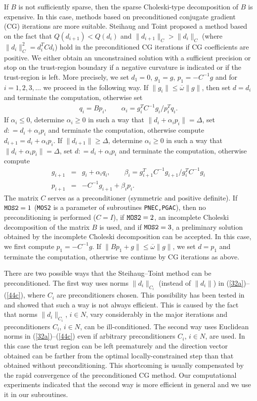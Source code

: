 \documentclass{esub2acm}
\newcommand{\beq}{\begin{eqnarray*}}
\newcommand{\eeq}{\end{eqnarray*}}
\begin{document}
\noindent If $B$ is not sufficiently sparse, then the sparse
Choleski-type decomposition of $B$ is expensive. In this case, methods
based on preconditioned conjugate gradient (CG) iterations are more
suitable. Steihaug \cite{ste1} and Toint \cite{toi1} proposed a
method based on the fact that $Q(d_{i+1}) < Q(d_i)$ and
$\|d_{i+1}\|_C > \|d_i\|_C$ (where $\|d_i\|_C^2 = d_i^TCd_i$) hold
in the preconditioned CG iterations if CG coefficients are positive.
We either obtain an unconstrained solution with a sufficient
precision or stop on the trust-region boundary if a negative
curvature is indicated or if the trust-region is left. More
precisely, we set $d_1 = 0$,  $g_1 = g$, $p_1 = -C^{-1} g$ and for $i
= 1,2,3, \dots$ we proceed in the following way. If $\| g_i \| \leq
\overline{\omega} \| g \|$, then set $d = d_i$ and terminate the
computation, otherwise set
%
\beq
q_i = B p_i, \qquad \alpha_i = g_i^T C^{-1} g_i / p_i^T q_i.
\eeq
%
If $\alpha_i \leq 0 $, determine $\alpha_i \geq 0$ in such a way that
$\|d_i + \alpha_i p_i\| = \Delta$, set $d: = d_i + \alpha_i p_i$ and
terminate the computation, otherwise compute $d_{i+1} = d_i + \alpha_i p_i$.
If $\|d_{i+1}\| \geq \Delta$, determine $\alpha_i \geq 0$ in such a way
that $\|d_i + \alpha_i p_i\| = \Delta$, set $d: = d_i + \alpha_i p_i$ and
terminate the computation, otherwise compute
%
\beq
g_{i+1} & = & g_i + \alpha_i q_i, \qquad
\beta_i = g_{i+1}^T C^{-1} g_{i+1} / g_i^T C^{-1} g_i \\
p_{i+1} & = & - C^{-1} g_{i+1} + \beta_i p_i.
\eeq
%
The matrix $C$ serves as a preconditioner (symmetric and positive definite).
If ${\tt MOS2}=1$ ({\tt MOS2} is a parameter of subroutines {\tt PNEC,PGAC}),
then no preconditioning is performed ($C = I$), if ${\tt MOS2} = 2$, an
incomplete Choleski decomposition of the matrix $B$ is used, and if
${\tt MOS2}=3$, a preliminary solution obtained by the incomplete Choleski
decomposition can be accepted. In this case, we first compute $p_1 = - C^{-1} g$.
If $\| B p_1 + g \| \leq \overline{\omega} \| g \|$, we set $d = p_1$ and
terminate the computation, otherwise we continue by CG iterations as above.

There are two possible ways that the Steihaug--Toint method can be
preconditioned. The first way uses norms $\|d_i\|_{C_i}$ (instead of
$\|d_i\|$) in (\ref{32a})--(\ref{44c}), where $C_i$ are
preconditioners chosen. This possibility has been tested in
\cite{glrt} and showed that such a way is not always efficient. This
is caused by the fact that norms $\|d_i\|_{C_i}$, $i \in N$,
vary considerably in the major iterations and preconditioners $C_i$,
$i \in N$, can be ill-conditioned. The second way uses
Euclidean norms in (\ref{32a})--(\ref{44c}) even if arbitrary
preconditioners $C_i$, $i \in N$, are used. In this case the
trust region can be left prematurely and the direction vector
obtained can be farther from the optimal locally-constrained step
than that obtained without preconditioning. This shortcoming is
usually compensated by the rapid convergence of the preconditioned
CG method. Our computational experiments indicated that the second
way is more efficient in general and we use it in our subroutines.
\end{document}
